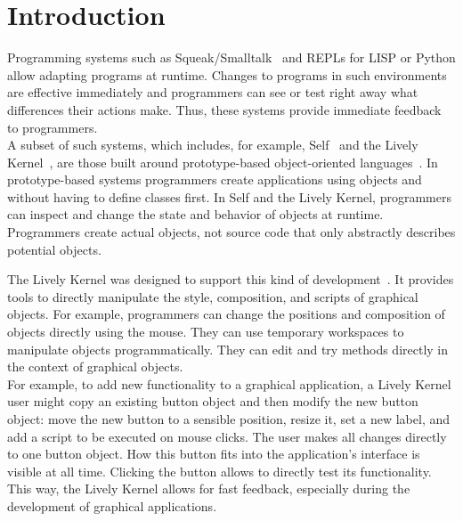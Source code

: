 
\chapter{Introduction} \label{chapter:INTRODUCTION}

Programming systems such as Squeak/Smalltalk~\cite{Ingalls1997Squeak,GoldbergRobson83} and REPLs for LISP or Python allow adapting programs at runtime.
Changes to programs in such environments are effective immediately and programmers can see or test right away what differences their actions make.
Thus, these systems provide immediate feedback to programmers.\\
A subset of such systems, which includes, for example, Self~\cite{Ungar1987SPS,Ungar2007SEL} and the Lively Kernel~\cite{Ingalls2008LKS,Krahn2009LWD}, are those built around prototype-based object-oriented languages~\cite{Lieberman1986UPO}.
In prototype-based systems programmers create applications using objects and without having to define classes first.
In Self and the Lively Kernel, programmers can inspect and change the state and behavior of objects at runtime.
Programmers create actual objects, not source code that only abstractly describes potential objects.

The Lively Kernel was designed to support this kind of development~\cite{Lincke2013UTW}.
It provides tools to directly manipulate the style, composition, and scripts of graphical objects.
For example, programmers can change the positions and composition of objects directly using the mouse.
They can use temporary workspaces to manipulate objects programmatically.
They can edit and try methods directly in the context of graphical objects.\\
For example, to add new functionality to a graphical application, a Lively Kernel user might copy an existing button object and then modify the new button object: move the new button to a sensible position, resize it, set a new label, and add a script to be executed on mouse clicks.
The user makes all changes directly to one button object.
How this button fits into the application's interface is visible at all time.
Clicking the button allows to directly test its functionality.
This way, the Lively Kernel allows for fast feedback, especially during the development of graphical applications.

